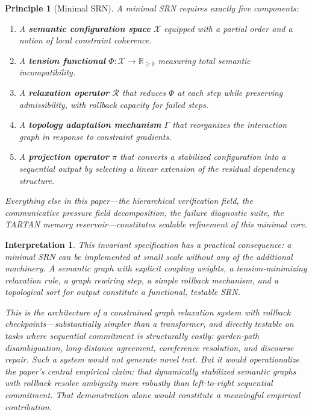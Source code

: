 \documentclass[11pt, a4paper]{article}
\theoremstyle{srn}
\newtheorem{principle}{Principle}[section]
\theoremstyle{srnremark}
\newtheorem{interpretation}{Interpretation}[section]
\newcommand{\Rop}{\mathcal{R}}           %
\newcommand{\Gop}{\Gamma}              %
\newcommand{\Phiten}{\varPhi}            %
\begin{document}
\begin{principle}[Minimal SRN]
\label{prin:minimal}
A minimal SRN requires exactly five components:
\begin{enumerate}
  \item[\textbf{(M1)}] A \textbf{semantic configuration space}
    $\mathcal{X}$ equipped with a partial order and a notion of local
    constraint coherence.
  \item[\textbf{(M2)}] A \textbf{tension functional} $\Phiten :
    \mathcal{X} \to \mathbb{R}_{\geq 0}$ measuring total semantic
    incompatibility.
  \item[\textbf{(M3)}] A \textbf{relaxation operator} $\Rop$ that
    reduces $\Phiten$ at each step while preserving admissibility,
    with rollback capacity for failed steps.
  \item[\textbf{(M4)}] A \textbf{topology adaptation mechanism}
    $\Gop$ that reorganizes the interaction graph in response to
    constraint gradients.
  \item[\textbf{(M5)}] A \textbf{projection operator} $\pi$ that
    converts a stabilized configuration into a sequential output by
    selecting a linear extension of the residual dependency structure.
\end{enumerate}
Everything else in this paper---the hierarchical verification field,
the communicative pressure field decomposition, the failure diagnostic
suite, the TARTAN memory reservoir---constitutes scalable refinement
of this minimal core.
\end{principle}

\begin{interpretation}
This invariant specification has a practical consequence: a minimal
SRN can be implemented at small scale without any of the additional
machinery.
A semantic graph with explicit coupling weights, a tension-minimizing
relaxation rule, a graph rewiring step, a simple rollback mechanism,
and a topological sort for output constitute a functional, testable
SRN.

This is the architecture of a constrained graph relaxation system with
rollback checkpoints---substantially simpler than a transformer, and
directly testable on tasks where sequential commitment is structurally
costly: garden-path disambiguation, long-distance agreement,
coreference resolution, and discourse repair.
Such a system would not generate novel text.
But it would operationalize the paper's central empirical claim: that
dynamically stabilized semantic graphs with rollback resolve
ambiguity more robustly than left-to-right sequential commitment.
That demonstration alone would constitute a meaningful empirical
contribution.
\end{interpretation}
\end{document}
